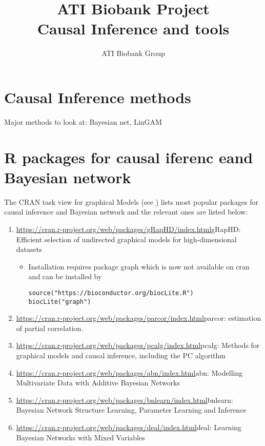 \documentclass{article}
\begin{document}
\title{ATI Biobank Project \\ Causal Inference and tools}

\author{ATI Biobank Group}

\maketitle

\section{Causal Inference methods}
Major methods to look at: Bayesian net, LinGAM
\section{R packages for causal iferenc eand Bayesian network}
The CRAN task view for graphical Models (see \href{https://cran.r-project.org/web/views/gR.html}) lists most popular packages for causal inference and Bayesian network and the relevant ones are listed below:

\begin{enumerate}
\item \url{https://cran.r-project.org/web/packages/gRapHD/index.html}{gRapHD}: Efficient selection of undirected graphical models for high-dimensional datasets
\begin{itemize}
\item Installation requires package graph which is now not available on cran and can be installed by 
\begin{verbatim}
source("https://bioconductor.org/biocLite.R")
biocLite("graph")
\end{verbatim}


\end{itemize}
\item \url{https://cran.r-project.org/web/packages/parcor/index.html}{parcor}: estimation of partial correlation.
\item \url{https://cran.r-project.org/web/packages/pcalg/index.html}{pcalg}: Methods for graphical models and causal inference, including the PC algorithm 
\item \url{https://cran.r-project.org/web/packages/abn/index.html}{abn}: Modelling Multivariate Data with Additive Bayesian Networks
\item \url{https://cran.r-project.org/web/packages/bnlearn/index.html}{bnlearn}: Bayesian Network Structure Learning, Parameter Learning and Inference
\item \url{https://cran.r-project.org/web/packages/deal/index.html}{deal}: Learning Bayesian Networks with Mixed Variables

\end{enumerate}
\end{document}
